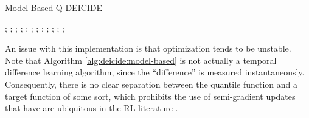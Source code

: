 \begin{algorithm}[h]
  \small
  \caption{Model-Based Q-DEICIDE}\label{alg:deicide:model-based}
  \begin{algorithmic}
      ; 
      ;
      ;
      ;
      ;
      ; 
      ; 
        ; 
        ;
      \EndFor
      ;
      ; 
      ;
    \EndFor
  \end{algorithmic}
\end{algorithm}

An issue with this implementation is that optimization tends to be
unstable. Note that Algorithm \ref{alg:deicide:model-based} is not
actually a temporal difference learning algorithm, since the
``difference'' is measured instantaneously. Consequently, there is
no clear separation between the quantile function and a target
function of some sort, which prohibits the use of semi-gradient
updates that have are ubiquitous in the RL literature \citep{sutton2018reinforcement}.

